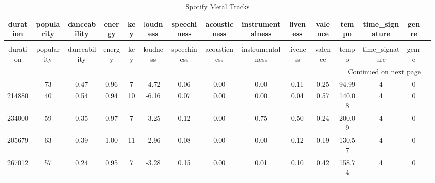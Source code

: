 \begin{longtable}[h!]{c|c|c|c|c|c|c|c|c|c|c|c|c|c|c}
\caption{Spotify Metal Tracks} \label{tab:metal_tracks_datatable} \\
\toprule
duration & popularity & danceability & energy & key & loudness & speechiness & acousticness & instrumentalness & liveness & valence & tempo & time_signature & genre \\
\midrule
\endfirsthead
\caption[]{Spotify Metal Tracks} \\
\toprule
duration & popularity & danceability & energy & key & loudness & speechiness & acousticness & instrumentalness & liveness & valence & tempo & time_signature & genre \\
\midrule
\endhead
\midrule
\multicolumn{14}{r}{Continued on next page} \\
\midrule
\endfoot
\bottomrule
\endlastfoot
245240 & 73 & 0.47 & 0.96 & 7 & -4.72 & 0.06 & 0.00 & 0.00 & 0.11 & 0.25 & 94.99 & 4 & 0 \\
214880 & 40 & 0.54 & 0.94 & 10 & -6.16 & 0.07 & 0.00 & 0.00 & 0.04 & 0.57 & 140.08 & 4 & 0 \\
234000 & 59 & 0.35 & 0.97 & 7 & -3.25 & 0.12 & 0.00 & 0.75 & 0.50 & 0.24 & 200.09 & 4 & 0 \\
205679 & 63 & 0.39 & 1.00 & 11 & -2.96 & 0.08 & 0.00 & 0.00 & 0.12 & 0.19 & 130.57 & 4 & 0 \\
267012 & 57 & 0.24 & 0.95 & 7 & -3.28 & 0.15 & 0.00 & 0.01 & 0.10 & 0.42 & 158.74 & 4 & 0 \\
\end{longtable}
